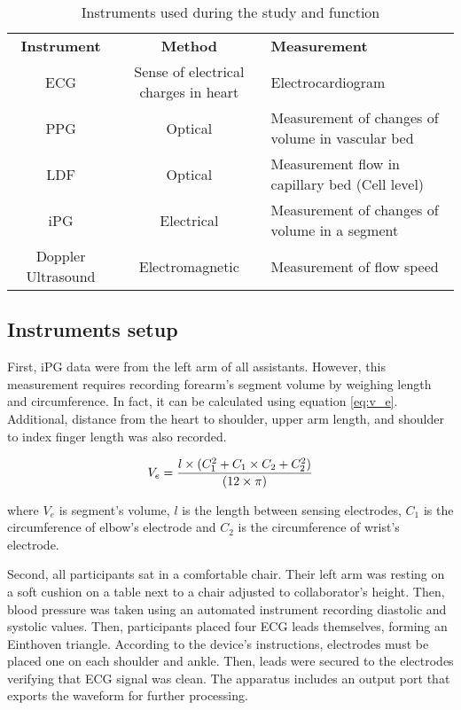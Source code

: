 \begin{table}
	\caption{Instruments used during the study and function}
	\centering
	\label{table:instruments}
	\begin{tabu}{ccp{4.5cm}}
		\hline 
		\textbf{Instrument} & \textbf{Method} & \textbf{Measurement} \\\tabucline[2pt]{-}
		ECG & Sense of electrical charges in heart & Electrocardiogram \\\hline 
		PPG & Optical & Measurement of changes of volume in vascular bed \\\hline 
		LDF & Optical & Measurement flow in capillary bed (Cell level) \\\hline 
		iPG & Electrical & Measurement of changes of volume in a segment \\\hline
		Doppler Ultrasound & Electromagnetic & Measurement of flow speed \\\hline 
	\end{tabu}  
\end{table}


\subsection{Instruments setup}
\label{section4.1.1}

First, iPG data were from the left arm of all assistants. However, this measurement requires recording forearm's segment volume by weighing length and circumference. In fact, it can be calculated using equation \ref{eq:v_e}. Additional, distance from the heart to shoulder, upper arm length, and shoulder to index finger length was also recorded. 

\begin{align}
	\label{eq:v_e}
	V_e =\frac{l \times (C_1^2+C_1 \times C_2 + C_2^2)}{(12 \times \pi)} \tagaddtext{[\si{\cubic\centi\meter}]}
\end{align}

where $V_e$ is segment's volume, $l$ is the length between sensing electrodes, $C_1$ is the circumference of elbow's electrode and $C_2$ is the circumference of wrist's electrode.

Second, all participants sat in a comfortable chair. Their left arm was resting on a soft cushion on a table next to a chair adjusted to collaborator's height. Then, blood pressure was taken using an automated instrument recording diastolic and systolic values. Then, participants placed four ECG leads themselves, forming an Einthoven triangle. According to the device's instructions, electrodes must be placed one on each shoulder and ankle. Then, leads were secured to the electrodes verifying that ECG signal was clean. The apparatus includes an output port that exports the waveform for further processing.


